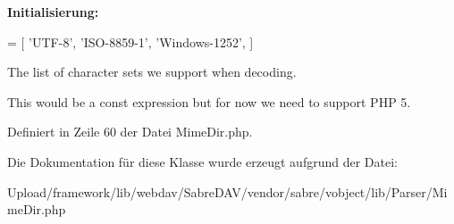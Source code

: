 {\bfseries Initialisierung\+:}
\begin{DoxyCode}
= [
        \textcolor{stringliteral}{'UTF-8'},
        \textcolor{stringliteral}{'ISO-8859-1'},
        \textcolor{stringliteral}{'Windows-1252'},
    ]
\end{DoxyCode}
The list of character sets we support when decoding.

This would be a const expression but for now we need to support P\+HP 5. 

Definiert in Zeile 60 der Datei Mime\+Dir.\+php.



Die Dokumentation für diese Klasse wurde erzeugt aufgrund der Datei\+:\begin{DoxyCompactItemize}
\item 
Upload/framework/lib/webdav/\+Sabre\+D\+A\+V/vendor/sabre/vobject/lib/\+Parser/Mime\+Dir.\+php\end{DoxyCompactItemize}
